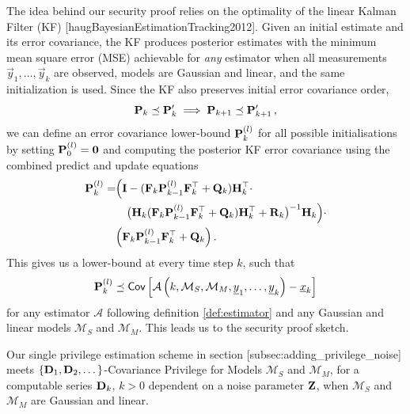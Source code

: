 The idea behind our security proof relies on the optimality of the linear Kalman Filter (KF) [haugBayesianEstimationTracking2012]. Given an initial estimate and its error covariance, the KF produces posterior estimates with the minimum mean square error (MSE) achievable for \textit{any} estimator when all measurements $\vec{y}_1,\dots,\vec{y}_k$ are observed, models are Gaussian and linear, and the same initialization is used. Since the KF also preserves initial error covariance order,
\begin{equation}
   {\ensuremath{{\mathbf{P}}}}_k \preceq {\ensuremath{{\mathbf{P}}}}_k^\prime \implies {\ensuremath{{\mathbf{P}}}}_{k+1} \preceq {\ensuremath{{\mathbf{P}}}}_{k+1}^\prime\,,
\end{equation}
we can define an error covariance lower-bound ${{\mathbf{P}}}_k^{(l)}$ for all possible initialisations by setting ${{\mathbf{P}}}_0^{(l)} = {{\mathbf{0}}}$ and computing the posterior KF error covariance using the combined predict and update equations
\begin{equation}\label{eqn:lower_bound_error_cov}
   \begin{split}
      {\ensuremath{{\mathbf{P}}}}_k^{(l)} =& \Bigl( {{\mathbf{I}}} - ({{\mathbf{F}}}_k{{\mathbf{P}}}_{k-1}^{(l)}{{\mathbf{F}}}_k^\top + {{\mathbf{Q}}}_k){{\mathbf{H}}}_k^\top \cdot \\
      &\quad\bigl({{\mathbf{H}}}_k({{\mathbf{F}}}_k{{\mathbf{P}}}_{k-1}^{(l)}{{\mathbf{F}}}_k^\top + {{\mathbf{Q}}}_k){{\mathbf{H}}}_k^\top + {{\mathbf{R}}}_k\bigr)^{-1}{{\mathbf{H}}}_k\Bigr)\cdot\\
      &\Bigl({{\mathbf{F}}}_k{{\mathbf{P}}}_{k-1}^{(l)}{{\mathbf{F}}}_k^\top + {{\mathbf{Q}}}_k\Bigr)\,.
   \end{split}
\end{equation}
This gives us a lower-bound at every time step $k$, such that
\begin{equation}
   {\ensuremath{{\mathbf{P}}}}_k^{(l)} \preceq \mathsf{Cov}\left[\mathcal{A}\left(k, \mathcal{M}_S, \mathcal{M}_M, {\underline{y}}_1,\dots,{\underline{y}}_k\right) - {\underline{x}}_k \right]
\end{equation}
for any estimator $\mathcal{A}$ following definition \ref{def:estimator} and any Gaussian and linear models $\mathcal{M}_S$ and $\mathcal{M}_M$. This leads us to the security proof sketch.

\begin{theorem}\label{thm:prooved_thm}
   Our single privilege estimation scheme in section [subsec:adding\_privilege\_noise] meets $\{{{\mathbf{D}}}_1,{{\mathbf{D}}}_2,\dots\}$-Covariance Privilege for Models $\mathcal{M}_S$ and $\mathcal{M}_M$, for a computable series ${{\mathbf{D}}}_k$, $k>0$ dependent on a noise parameter ${{\mathbf{Z}}}$, when $\mathcal{M}_S$ and $\mathcal{M}_M$ are Gaussian and linear.
\end{theorem}

